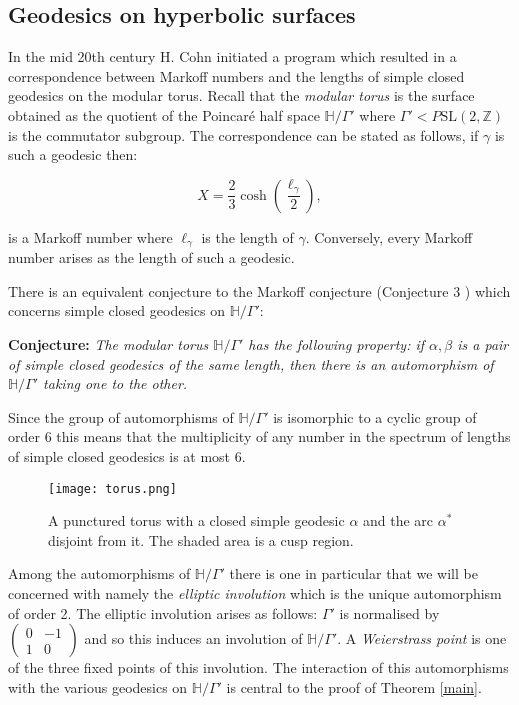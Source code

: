 \documentclass[12pt,a4paper]{amsart}
\def\HH{\mathbb{H}}
\def\xx{\HH/\Gamma'}
\def\ZZ{\mathbb{Z}}
\def\sl2{\mathrm{SL}(2, \ZZ)}
\begin{document}
\subsection{Geodesics on hyperbolic surfaces} In the mid 20th century H. Cohn
initiated a program which resulted in a correspondence between Markoff numbers
and the lengths of simple closed geodesics on the modular torus. Recall that
the \textit{modular torus} is the surface obtained as the quotient of the
Poincar\'e half space $\HH/\Gamma'$ where $\Gamma' < P\sl2$ is the commutator
subgroup. The correspondence can be stated as follows, if $\gamma$ is such a
geodesic then: 

\begin{equation} X  = \frac{2}{3} \cosh \left(
\frac{\ell_\gamma}{2}\right),
\end{equation} 

is a Markoff number where
$\ell_\gamma$ is the length of $\gamma$. Conversely, every Markoff number
arises as the length of such a geodesic.

There is an equivalent conjecture to the Markoff conjecture (Conjecture 3
\cite{mcp}) which concerns simple closed geodesics on $\xx$:

\noindent
\textbf{Conjecture:} \textit{The modular torus $\xx$ has the following property: if $\alpha, \beta$
is a pair of simple closed geodesics of the same length, then there is an
automorphism  of $\xx$ taking one to the other.}

Since the group of automorphisms of $\xx$ is isomorphic to a cyclic group of
order 6 this means that the multiplicity of any number in the spectrum of
lengths of simple closed geodesics is at most 6.

\begin{figure}[ht]
\begin{center}
\texttt{[image: torus.png]} 
\end{center}
\caption{A punctured torus with a closed simple geodesic $\alpha$ and the arc $\alpha^*$ disjoint from it. The shaded area is a cusp region.}
	\label{fig:torus}
\end{figure}

Among the automorphisms of $\xx$ there is one in particular that we will be
concerned with namely the \textit{elliptic involution} which is the unique
automorphism of order 2. The elliptic involution arises as follows: $\Gamma'$
is normalised by $\begin{pmatrix} 0 & -1 \\ 1 & 0 \end{pmatrix}$ and so this
induces an involution of $\xx$. A \textit{Weierstrass point} is one of the
three fixed points of this involution. The interaction of this automorphisms
with the various geodesics on $\xx$ is central to the proof of Theorem
\ref{main}.
\end{document}
